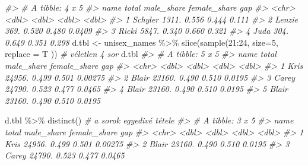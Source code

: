 \documentclass[
]{book}
\newenvironment{Shaded}{\begin{snugshade}}{\end{snugshade}}
\newcommand{\AttributeTok}[1]{\textcolor[rgb]{0.77,0.63,0.00}{#1}}
\newcommand{\CommentTok}[1]{\textcolor[rgb]{0.56,0.35,0.01}{\textit{#1}}}
\newcommand{\DecValTok}[1]{\textcolor[rgb]{0.00,0.00,0.81}{#1}}
\newcommand{\FunctionTok}[1]{\textcolor[rgb]{0.00,0.00,0.00}{#1}}
\newcommand{\NormalTok}[1]{#1}
\newcommand{\OtherTok}[1]{\textcolor[rgb]{0.56,0.35,0.01}{#1}}
\newcommand{\SpecialCharTok}[1]{\textcolor[rgb]{0.00,0.00,0.00}{#1}}
\begin{document}
\begin{Shaded}
\begin{Highlighting}[]
\CommentTok{\#\textgreater{} \# A tibble: 4 x 5}
\CommentTok{\#\textgreater{}   name    total male\_share female\_share    gap}
\CommentTok{\#\textgreater{}   \textless{}chr\textgreater{}   \textless{}dbl\textgreater{}      \textless{}dbl\textgreater{}        \textless{}dbl\textgreater{}  \textless{}dbl\textgreater{}}
\CommentTok{\#\textgreater{} 1 Schyler 1311.      0.556        0.444 0.111 }
\CommentTok{\#\textgreater{} 2 Lenzie   369.      0.520        0.480 0.0409}
\CommentTok{\#\textgreater{} 3 Ricki   5847.      0.340        0.660 0.321 }
\CommentTok{\#\textgreater{} 4 Juda     304.      0.649        0.351 0.298}
\NormalTok{d.tbl }\OtherTok{\textless{}{-}}\NormalTok{ unisex\_names }\SpecialCharTok{\%\textgreater{}\%} \FunctionTok{slice}\NormalTok{(}\FunctionTok{sample}\NormalTok{(}\DecValTok{21}\SpecialCharTok{:}\DecValTok{24}\NormalTok{, }\AttributeTok{size=}\DecValTok{5}\NormalTok{, }\AttributeTok{replace =}\NormalTok{ T )) }\CommentTok{\# véletlen 4 sor}
\NormalTok{d.tbl}
\CommentTok{\#\textgreater{} \# A tibble: 5 x 5}
\CommentTok{\#\textgreater{}   name   total male\_share female\_share     gap}
\CommentTok{\#\textgreater{}   \textless{}chr\textgreater{}  \textless{}dbl\textgreater{}      \textless{}dbl\textgreater{}        \textless{}dbl\textgreater{}   \textless{}dbl\textgreater{}}
\CommentTok{\#\textgreater{} 1 Kris  24956.      0.499        0.501 0.00275}
\CommentTok{\#\textgreater{} 2 Blair 23160.      0.490        0.510 0.0195 }
\CommentTok{\#\textgreater{} 3 Carey 24790.      0.523        0.477 0.0465 }
\CommentTok{\#\textgreater{} 4 Blair 23160.      0.490        0.510 0.0195 }
\CommentTok{\#\textgreater{} 5 Blair 23160.      0.490        0.510 0.0195}

\NormalTok{d.tbl }\SpecialCharTok{\%\textgreater{}\%} \FunctionTok{distinct}\NormalTok{()   }\CommentTok{\# a sorok egyedivé tétele}
\CommentTok{\#\textgreater{} \# A tibble: 3 x 5}
\CommentTok{\#\textgreater{}   name   total male\_share female\_share     gap}
\CommentTok{\#\textgreater{}   \textless{}chr\textgreater{}  \textless{}dbl\textgreater{}      \textless{}dbl\textgreater{}        \textless{}dbl\textgreater{}   \textless{}dbl\textgreater{}}
\CommentTok{\#\textgreater{} 1 Kris  24956.      0.499        0.501 0.00275}
\CommentTok{\#\textgreater{} 2 Blair 23160.      0.490        0.510 0.0195 }
\CommentTok{\#\textgreater{} 3 Carey 24790.      0.523        0.477 0.0465}



\end{Highlighting}
\end{Shaded}
\end{document}

